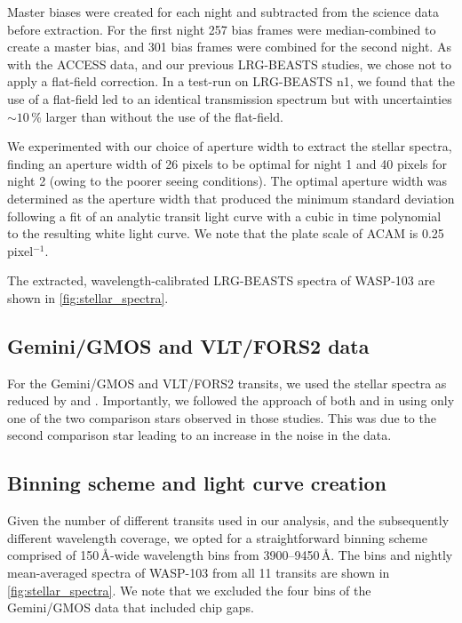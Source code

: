 \documentclass[twocolumn]{aastex63}
\begin{document}
Master biases were created for each night and subtracted from the science data before extraction. For the first night 257 bias frames were median-combined to create a master bias, and 301 bias frames were combined for the second night. As with the ACCESS data, and our previous LRG-BEASTS studies, we chose not to apply a flat-field correction. In a test-run on LRG-BEASTS n1, we found that the use of a flat-field led to an identical transmission spectrum but with uncertainties $\sim10$\,\% larger than without the use of the flat-field.

We experimented with our choice of aperture width to extract the stellar spectra, finding an aperture width of 26 pixels to be optimal for night 1 and 40 pixels for night 2 (owing to the poorer seeing conditions). The optimal aperture width was determined as the aperture width that produced the minimum standard deviation following a fit of an analytic transit light curve with a cubic in time polynomial to the resulting white light curve. We note that the plate scale of ACAM is 0.25\,\arcsec \,pixel$^{-1}$.

The extracted, wavelength-calibrated LRG-BEASTS spectra of WASP-103 are shown in \autoref{fig:stellar_spectra}.


\subsection{Gemini/GMOS and VLT/FORS2 data}
\label{sec:dr_GMOS}

For the Gemini/GMOS and VLT/FORS2 transits, we used the stellar spectra as reduced by \cite{Lendl2017} and \cite{Wilson2020}. Importantly, we followed the approach of both \cite{Lendl2017} and \cite{Wilson2020} in using only one of the two comparison stars observed in those studies. This was due to the second comparison star leading to an increase in the noise in the data.



\subsection{Binning scheme and light curve creation}
\label{sec:binning_scheme}



Given the number of different transits used in our analysis, and the subsequently different wavelength coverage, we opted for a straightforward binning scheme comprised of 150\,\AA-wide wavelength bins from 3900--9450\,\AA. The bins and nightly mean-averaged spectra of WASP-103 from all 11 transits are shown in \autoref{fig:stellar_spectra}. We note that we excluded the four bins of the Gemini/GMOS data that included chip gaps.
\end{document}
